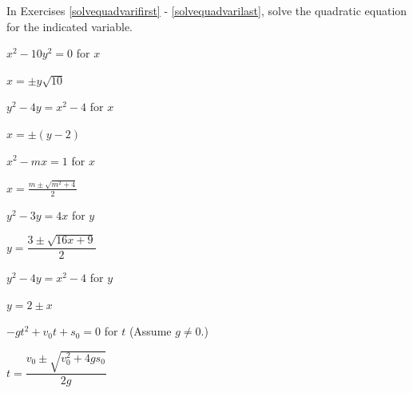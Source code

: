 \documentclass{ximera}
\begin{document}
\begin{question}
In Exercises \ref{solvequadvarifirst} - \ref{solvequadvarilast}, solve the quadratic equation for the indicated variable.

\begin{problem}\label{solvequadvarifirst}
$x^{2} - 10y^{2} = 0$ for $x$

\begin{solution}
    $x = \pm y\sqrt{10}$
\end{solution}

\end{problem}

\begin{problem}
$y^{2} - 4y = x^{2} - 4$ for $x$

\begin{solution}
     $x = \pm (y - 2) $
\end{solution}

\end{problem}

\begin{problem}
$x^{2} - mx = 1$ for $x$

\begin{solution}
    $x = \frac{m \pm \sqrt{m^{2} + 4}}{2}$
\end{solution}
\end{problem}

\begin{problem}
$y^{2} - 3y = 4x$ for $y$

\begin{solution}
    $y = \dfrac{3 \pm \sqrt{16x + 9}}{2}$ 
\end{solution}
\end{problem}

\begin{problem}
$y^{2} - 4y = x^{2} - 4$ for $y$

\begin{solution}
    $y = 2 \pm x$
\end{solution}
\end{problem}

\begin{problem}\label{solvequadvarilast}
$-gt^{2} + v_0t + s_0 = 0$ for $t$ (Assume $g \neq 0$.)

\begin{solution}
    $t = \dfrac{v_0 \pm \sqrt{v_0^{2} + 4gs_0}}{2g}  $
\end{solution}
\end{problem}

\end{question}
\end{document}
